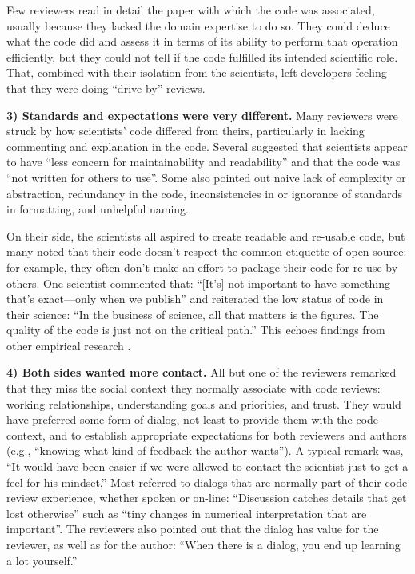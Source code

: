 \documentclass[10pt,twocolumn]{article}
\begin{document}
Few reviewers read in detail the paper with which the code was associated,
usually because they lacked the domain expertise to do so.
They could deduce what the code did and assess it in terms of its ability to perform that operation efficiently,
but they could not tell if the code fulfilled its intended scientific role.
That,
combined with their isolation from the scientists,
left developers feeling that they were doing ``drive-by'' reviews.

\noindent \textbf{3) Standards and expectations were very different.}
Many reviewers were struck by how scientists' code differed from theirs,
particularly in lacking commenting and explanation in the code.
Several suggested that scientists appear to have ``less concern for maintainability and readability''
and that the code was ``not written for others to use''.
Some also pointed out naive lack of complexity or abstraction,
redundancy in the code,
inconsistencies in or ignorance of standards in formatting,
and unhelpful naming.

On their side,
the scientists all aspired to create readable and re-usable code,
but many noted that their code doesn't respect the common etiquette of open source:
for example,
they often don't make an effort to package their code for re-use by others.
One scientist commented that:
``[It's] not important to have something that's exact---only when we publish''
and reiterated the low status of code in their science:
``In the business of science, all that matters is the figures. The quality of the code is just not on the critical path.''
This echoes findings from other empirical research \cite{b:segal2005,b:segal2007}.

\noindent \textbf{4) Both sides wanted more contact.}
All but one of the reviewers remarked that they miss the social context they normally associate with code reviews:
working relationships, understanding goals and priorities, and trust.
They would have preferred some form of dialog,
not least to provide them with the code context,
and to establish appropriate expectations for both reviewers and authors
(e.g., ``knowing what kind of feedback the author wants'').
A typical remark was,
``It would have been easier if we were allowed to contact the scientist just to get a feel for his mindset.''
Most referred to dialogs that are normally part of their code review experience,
whether spoken or on-line:
``Discussion catches details that get lost otherwise''
such as ``tiny changes in numerical interpretation that are important''.
The reviewers also pointed out that the dialog has value for the reviewer,
as well as for the author:
``When there is a dialog, you end up learning a lot yourself.''
\end{document}
